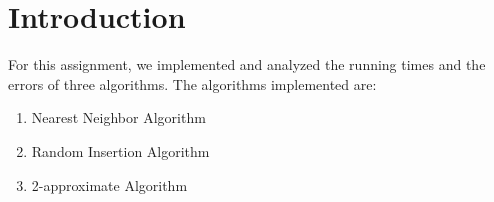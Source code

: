 \section{Introduction}
For this assignment, we implemented and analyzed the running times and the errors of three algorithms. The algorithms implemented are:
\begin{enumerate}
	\item Nearest Neighbor Algorithm
	\item Random Insertion Algorithm
	\item 2-approximate Algorithm
\end{enumerate}

\pagebreak
